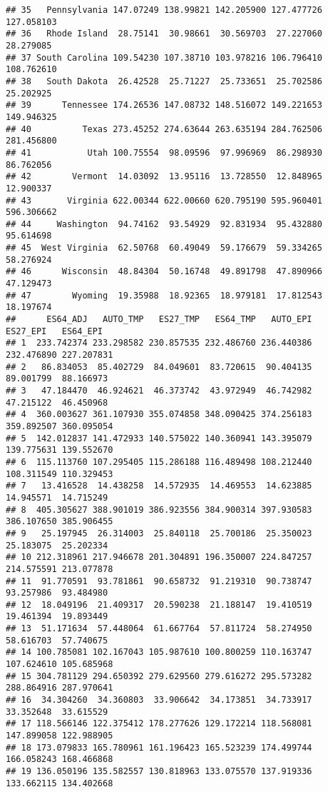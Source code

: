 \documentclass[
]{article}
\begin{document}
\begin{verbatim}
## 35   Pennsylvania 147.07249 138.99821 142.205900 127.477726 127.058103
## 36   Rhode Island  28.75141  30.98661  30.569703  27.227060  28.279085
## 37 South Carolina 109.54230 107.38710 103.978216 106.796410 108.762610
## 38   South Dakota  26.42528  25.71227  25.733651  25.702586  25.202925
## 39      Tennessee 174.26536 147.08732 148.516072 149.221653 149.946325
## 40          Texas 273.45252 274.63644 263.635194 284.762506 281.456800
## 41           Utah 100.75554  98.09596  97.996969  86.298930  86.762056
## 42        Vermont  14.03092  13.95116  13.728550  12.848965  12.900337
## 43       Virginia 622.00344 622.00660 620.795190 595.960401 596.306662
## 44     Washington  94.74162  93.54929  92.831934  95.432880  95.614698
## 45  West Virginia  62.50768  60.49049  59.176679  59.334265  58.276924
## 46      Wisconsin  48.84304  50.16748  49.891798  47.890966  47.129473
## 47        Wyoming  19.35988  18.92365  18.979181  17.812543  18.197674
##      ES64_ADJ   AUTO_TMP   ES27_TMP   ES64_TMP   AUTO_EPI   ES27_EPI   ES64_EPI
## 1  233.742374 233.298582 230.857535 232.486760 236.440386 232.476890 227.207831
## 2   86.834053  85.402729  84.049601  83.720615  90.404135  89.001799  88.166973
## 3   47.184470  46.924621  46.373742  43.972949  46.742982  47.215122  46.450968
## 4  360.003627 361.107930 355.074858 348.090425 374.256183 359.892507 360.095054
## 5  142.012837 141.472933 140.575022 140.360941 143.395079 139.775631 139.552670
## 6  115.113760 107.295405 115.286188 116.489498 108.212440 108.311549 110.329453
## 7   13.416528  14.438258  14.572935  14.469553  14.623885  14.945571  14.715249
## 8  405.305627 388.901019 386.923556 384.900314 397.930583 386.107650 385.906455
## 9   25.197945  26.314003  25.840118  25.700186  25.350023  25.183075  25.202334
## 10 212.318961 217.946678 201.304891 196.350007 224.847257 214.575591 213.077878
## 11  91.770591  93.781861  90.658732  91.219310  90.738747  93.257986  93.484980
## 12  18.049196  21.409317  20.590238  21.188147  19.410519  19.461394  19.893449
## 13  51.171634  57.448064  61.667764  57.811724  58.274950  58.616703  57.740675
## 14 100.785081 102.167043 105.987610 100.800259 110.163747 107.624610 105.685968
## 15 304.781129 294.650392 279.629560 279.616272 295.573282 288.864916 287.970641
## 16  34.304260  34.360803  33.906642  34.173851  34.733917  33.352648  33.615529
## 17 118.566146 122.375412 178.277626 129.172214 118.568081 147.899058 122.988905
## 18 173.079833 165.780961 161.196423 165.523239 174.499744 166.058243 168.466868
## 19 136.050196 135.582557 130.818963 133.075570 137.919336 133.662115 134.402668

\end{verbatim}
\end{document}
